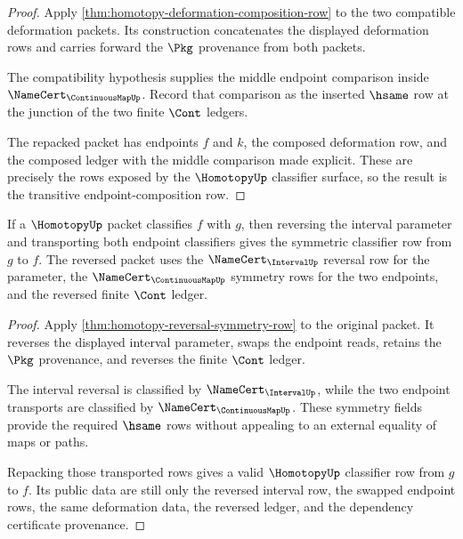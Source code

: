 \begin{proof}
Apply \autoref{thm:homotopy-deformation-composition-row} to the two compatible
deformation packets. Its construction concatenates the displayed deformation
rows and carries forward the $\Pkg$ provenance from both packets.

The compatibility hypothesis supplies the middle endpoint comparison inside
$\NameCert_{\ContinuousMapUp}$. Record that comparison as the inserted
$\hsame$ row at the junction of the two finite $\Cont$ ledgers.

The repacked packet has endpoints $f$ and $k$, the composed deformation row,
and the composed ledger with the middle comparison made explicit. These are
precisely the rows exposed by the $\HomotopyUp$ classifier surface, so the
result is the transitive endpoint-composition row.
\end{proof}

\begin{theorem}
\label{thm:homotopy-reversal-classifier-symmetry-row}
If a $\HomotopyUp$ packet classifies $f$ with $g$, then reversing the interval
parameter and transporting both endpoint classifiers gives the symmetric
classifier row from $g$ to $f$. The reversed packet uses the
$\NameCert_{\IntervalUp}$ reversal row for the parameter, the
$\NameCert_{\ContinuousMapUp}$ symmetry rows for the two endpoints, and the
reversed finite $\Cont$ ledger.
\end{theorem}

\begin{proof}
Apply \autoref{thm:homotopy-reversal-symmetry-row} to the original packet. It
reverses the displayed interval parameter, swaps the endpoint reads, retains
the $\Pkg$ provenance, and reverses the finite $\Cont$ ledger.

The interval reversal is classified by $\NameCert_{\IntervalUp}$, while the
two endpoint transports are classified by $\NameCert_{\ContinuousMapUp}$.
These symmetry fields provide the required $\hsame$ rows without appealing to
an external equality of maps or paths.

Repacking those transported rows gives a valid $\HomotopyUp$ classifier row
from $g$ to $f$. Its public data are still only the reversed interval row, the
swapped endpoint rows, the same deformation data, the reversed ledger, and the
dependency certificate provenance.
\end{proof}

